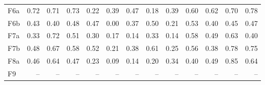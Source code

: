\begin{table}[htbp]
\begin{threeparttable}
\begin{tabular}{@{}lrrrrrrrrrrrr@{}}
F6a & 0.72 & 0.71 & 0.73 & 0.22 & 0.39 & 0.47 & 0.18 & 0.39 & 0.60 & 0.62 & 0.70 & 0.78 \\
F6b & 0.43 & 0.40 & 0.48 & 0.47 & 0.00 & 0.37 & 0.50 & 0.21 & 0.53 & 0.40 & 0.45 & 0.47 \\
F7a & 0.33 & 0.72 & 0.51 & 0.30 & 0.17 & 0.14 & 0.33 & 0.14 & 0.58 & 0.49 & 0.63 & 0.40 \\
F7b & 0.48 & 0.67 & 0.58 & 0.52 & 0.21 & 0.38 & 0.61 & 0.25 & 0.56 & 0.38 & 0.78 & 0.75 \\
F8a & 0.46 & 0.64 & 0.47 & 0.23 & 0.09 & 0.14 & 0.20 & 0.34 & 0.40 & 0.49 & 0.85 & 0.64 \\
F9 & -- & -- & -- & -- & -- & -- & -- & -- & -- & -- & -- & -- \\
\bottomrule
\end{tabular}
\end{threeparttable}
\end{table}
